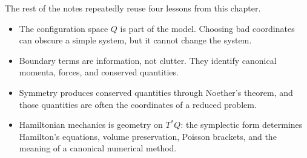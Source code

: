 The rest of the notes repeatedly reuse four lessons from this chapter.
\begin{itemize}
\item The configuration space \(Q\) is part of the model. Choosing bad
coordinates can obscure a simple system, but it cannot change the system.
\item Boundary terms are information, not clutter. They identify canonical
momenta, forces, and conserved quantities.
\item Symmetry produces conserved quantities through Noether's theorem, and
those quantities are often the coordinates of a reduced problem.
\item Hamiltonian mechanics is geometry on \(T^*Q\): the symplectic form
determines Hamilton's equations, volume preservation, Poisson brackets, and the
meaning of a canonical numerical method.
\end{itemize}

